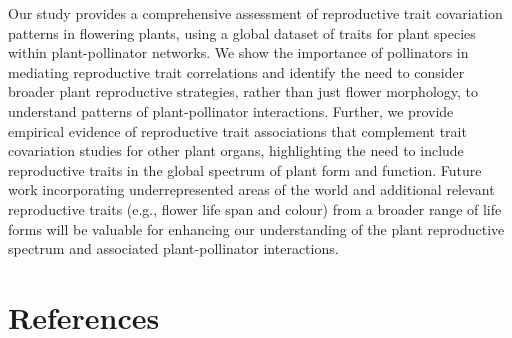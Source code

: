 \documentclass[
  12pt,
  a4paper,
]{article}
\begin{document}
Our study provides a comprehensive assessment of reproductive trait covariation patterns in flowering plants, using a global dataset of traits for plant species within plant-pollinator networks. We show the importance of pollinators in mediating reproductive trait correlations and identify the need to consider broader plant reproductive strategies, rather than just flower morphology, to understand patterns of plant-pollinator interactions. Further, we provide empirical evidence of reproductive trait associations that complement trait covariation studies for other plant organs, highlighting the need to include reproductive traits in the global spectrum of plant form and function. Future work incorporating underrepresented areas of the world and additional relevant reproductive traits (e.g., flower life span and colour) from a broader range of life forms will be valuable for enhancing our understanding of the plant reproductive spectrum and associated plant-pollinator interactions.

\newpage

\hypertarget{references}{%
\section{References}\label{references}}
\end{document}
